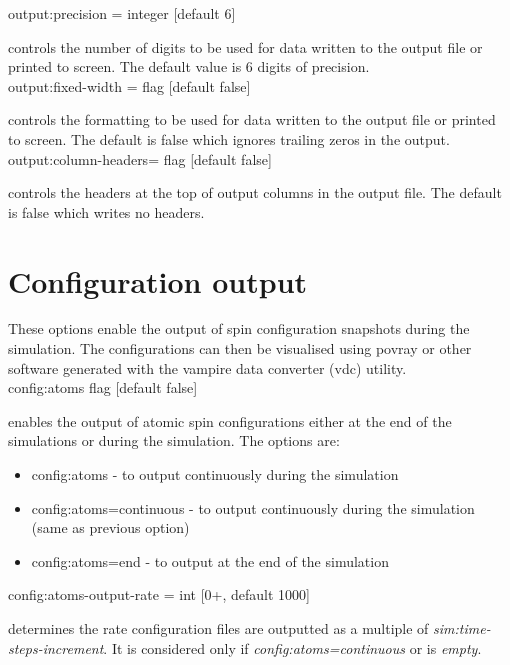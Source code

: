 {\zicf output:precision = integer [default 6]} controls
the number of digits to be used for data written to the output file or printed to screen. The default value
is 6 digits of precision. \\

{\zicf output:fixed-width = flag [default false]} controls
the formatting to be used for data written to the output file or printed to screen. The default is false which
ignores trailing zeros in the output.\\

{\zicf output:column-headers= flag [default false]} controls
the headers at the top of output columns in the output file. The default is false which writes no headers.\\

\section*{Configuration output}
These options enable the output of spin configuration snapshots during the
simulation. The configurations can then be visualised using povray or other
software generated with the vampire data converter (vdc) utility.\\

{\zicf config:atoms flag [default false]}
enables the output of atomic spin configurations either at the end of the simulations or during the simulation. The options are:
\begin{itemize}
  \item[] config:atoms - to output continuously during the simulation
  \item[] config:atoms=continuous - to output continuously during the simulation (same as previous option)
  \item[] config:atoms=end - to output at the end of the simulation
\end{itemize}

{\zicf config:atoms-output-rate = int [0+, default 1000]}
determines the rate configuration files are outputted as a multiple of \textit{sim:time-steps-increment}. It is considered only if \textit{config:atoms=continuous} or is \textit{empty}.\\

